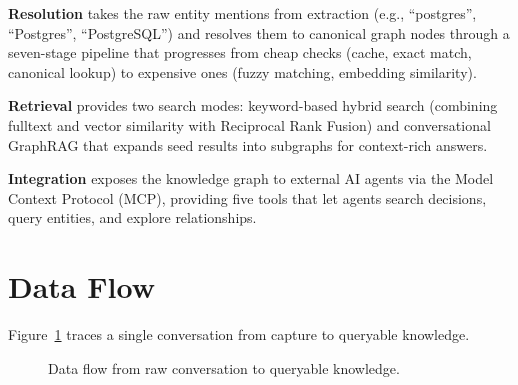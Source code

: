 \textbf{Resolution} takes the raw entity mentions from extraction (e.g.,
``postgres'', ``Postgres'', ``PostgreSQL'') and resolves them to canonical
graph nodes through a seven-stage pipeline that progresses from cheap checks
(cache, exact match, canonical lookup) to expensive ones (fuzzy matching,
embedding similarity).

\textbf{Retrieval} provides two search modes: keyword-based hybrid search
(combining fulltext and vector similarity with Reciprocal Rank Fusion) and
conversational GraphRAG that expands seed results into subgraphs for
context-rich answers.

\textbf{Integration} exposes the knowledge graph to external AI agents via the
Model Context Protocol (MCP), providing five tools that let agents search
decisions, query entities, and explore relationships.


\section{Data Flow}
\label{sec:data-flow}

Figure~\ref{fig:data-flow} traces a single conversation from capture to
queryable knowledge.

\begin{figure}[ht]
\centering
{}
\caption{Data flow from raw conversation to queryable knowledge.}
\label{fig:data-flow}
\end{figure}

